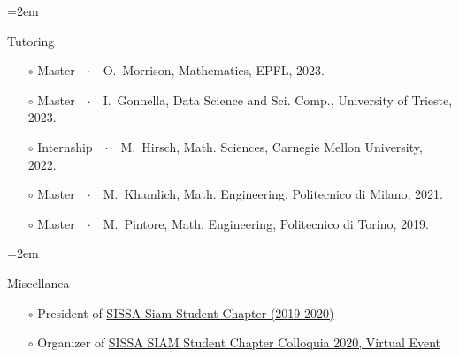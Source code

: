 \documentclass{scrartcl}
\newcommand{\Description}[1]{\hangindent=2em\hangafter=0\noindent\raggedright\footnotesize{#1}\par\normalsize\vspace{1em}} %
\begin{document}
\begin{cv}{}
\Description{{\color{cyan} Tutoring}
\begin{itemize}
    \item[$\circ$] {\color{PineGreen}Master}\ \ $\cdotp$\ \  O.\ Morrison, Mathematics, EPFL, 2023.
    \item[$\circ$] {\color{PineGreen}Master}\ \ $\cdotp$\ \  I.\ Gonnella, Data Science and Sci. Comp., University of Trieste, 2023.
    \item[$\circ$] {\color{NavyBlue}Internship}\ \ $\cdotp$\ \ M.\ Hirsch, Math. Sciences, Carnegie Mellon University, 2022.
    \item[$\circ$] {\color{PineGreen}Master}\ \ $\cdotp$\ \  M.\ Khamlich, Math. Engineering, Politecnico di Milano, 2021.
    \item[$\circ$] {\color{PineGreen}Master}\ \ $\cdotp$\ \  M.\ Pintore, Math. Engineering, Politecnico di Torino, 2019.
\end{itemize}}
\vspace{-0.5em}
\Description{{\color{cyan} Miscellanea}
\begin{itemize} 
    \item[$\circ$] President of \href{http://www.math.sissa.it/content/sissa-siam-student-chapter}{SISSA Siam Student Chapter (2019-2020)}
    \item[$\circ$] Organizer of \href{https://www.math.sissa.it/seminar/siam-chapter-colloquia-2020}{SISSA SIAM Student Chapter Colloquia 2020, Virtual Event}

\end{itemize}}
\end{cv}
\end{document}
